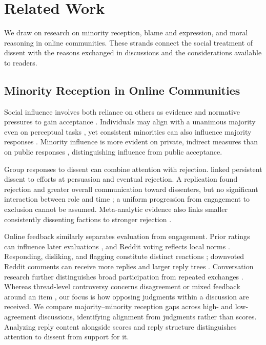 \section{Related Work}
\label{sec:related-work}

We draw on research on minority reception, blame and expression, and moral reasoning in online communities. These strands connect the social treatment of dissent with the reasons exchanged in discussions and the considerations available to readers.

\subsection{Minority Reception in Online Communities}
\label{subsec:related-minority-reception}

Social influence involves both reliance on others as evidence and normative pressures to gain acceptance \cite{deutsch1955normative,toelch2015conformity}. Individuals may align with a unanimous majority even on perceptual tasks \cite{asch1956independence}, yet consistent minorities can also influence majority responses \cite{moscovici1969minority}. Minority influence is more evident on private, indirect measures than on public responses \cite{wood1994minority}, distinguishing influence from public acceptance.

Group responses to dissent can combine attention with rejection. \citet{schachter1951deviation} linked persistent dissent to efforts at persuasion and eventual rejection. A replication found rejection and greater overall communication toward dissenters, but no significant interaction between role and time \cite{wesselmann2014revisiting}; a uniform progression from engagement to exclusion cannot be assumed. Meta-analytic evidence also links smaller consistently dissenting factions to stronger rejection \cite{tata1996proportionate}.

Online feedback similarly separates evaluation from engagement. Prior ratings can influence later evaluations \cite{muchnik2013social,glenski2017rating}, and Reddit voting reflects local norms \cite{graham2021sociomateriality}. Responding, disliking, and flagging constitute distinct reactions \cite{kalch2017replying}; downvoted Reddit comments can receive more replies and larger reply trees \cite{davis2021emotional}. Conversation research further distinguishes broad participation from repeated exchanges \cite{backstrom2013threads,choi2015reddit}. Whereas thread-level controversy concerns disagreement or mixed feedback around an item \cite{hessel2019brewing}, our focus is how opposing judgments within a discussion are received. We compare majority--minority reception gaps across high- and low-agreement discussions, identifying alignment from judgments rather than scores. Analyzing reply content alongside scores and reply structure distinguishes attention to dissent from support for it.

